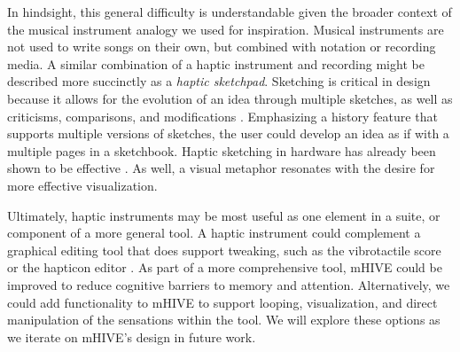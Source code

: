 In hindsight, this general difficulty is understandable given the broader context of the musical instrument analogy we used for inspiration.
Musical instruments are not used to write songs on their own, but %
combined with notation or recording media.
A similar combination of a haptic instrument and recording might be described more succinctly as %
 a \emph{haptic sketchpad}.
Sketching is critical in design because it allows for the evolution of an idea through multiple sketches, as well as criticisms, comparisons, and modifications \cite{Cross2011}.
Emphasizing a history feature that supports multiple versions of sketches, the user could develop an idea as if with a multiple pages in a sketchbook.
Haptic sketching in hardware has already been shown to be %
effective \cite{Moussette2011}.  %
As well, a visual metaphor resonates with the desire for more effective visualization.

Ultimately, haptic instruments may be most useful as one element
in a suite, or component of a more general tool.
A haptic instrument could complement %
a graphical editing tool that does support tweaking, such as the vibrotactile score \cite{Lee2012,Lee2009} or the hapticon editor \cite{Enriquez2003}.
As part of a more comprehensive tool, mHIVE could be improved to reduce cognitive barriers to memory and attention.
Alternatively, we could add functionality to mHIVE to support looping, visualization, and direct manipulation of the sensations within the tool.
We will explore these options as we iterate on mHIVE's design in future work.




